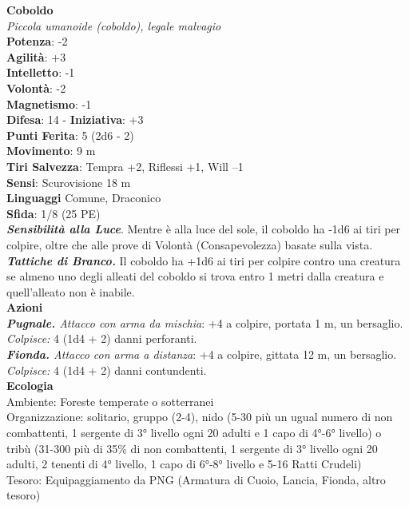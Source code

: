 \begin{multicols}{2}
\medskip\textbf{Coboldo}\\
\emph{Piccola umanoide (coboldo), legale malvagio}\\
\textbf{Potenza}: -2\\
\textbf{Agilità}: +3\\
\textbf{Intelletto}: -1\\
\textbf{Volontà}: -2\\
\textbf{Magnetismo}: -1\\
\textbf{Difesa}: 14 - \textbf{Iniziativa}: +3\\
\textbf{Punti Ferita}: 5 (2d6 - 2)\\
\textbf{Movimento}: 9 m\\
\textbf{Tiri Salvezza}: Tempra +2, Riflessi +1, Will –1\\
\textbf{Sensi}: Scurovisione 18 m\\
\textbf{Linguaggi} Comune, Draconico\\
\textbf{Sfida}: 1/8 (25 PE)\smallskip\\
\emph{\textbf{Sensibilità alla Luce}}. Mentre è alla luce del sole, il coboldo ha -1d6 ai tiri per colpire, oltre che alle prove di Volontà (Consapevolezza) basate sulla vista.\\
\emph{\textbf{Tattiche di Branco.}} Il coboldo ha +1d6 ai tiri per colpire contro una creatura se almeno uno degli alleati del coboldo si trova entro 1 metri dalla creatura e quell'alleato non è inabile. \\
\smallskip\textbf{Azioni}\\
\emph{\textbf{Pugnale.} Attacco con arma da mischia}: +4 a colpire, portata 1 m, un bersaglio.\\
\emph{Colpisce:} 4 (1d4 + 2) danni perforanti.\\
\emph{\textbf{Fionda.} Attacco con arma a distanza}: +4 a colpire, gittata 12 m, un bersaglio.\\
\emph{Colpisce:} 4 (1d4 + 2) danni contundenti.\\
\textbf{Ecologia}\\
Ambiente: Foreste temperate o sotterranei\\
Organizzazione: solitario, gruppo (2-4), nido (5-30 più un ugual numero di non combattenti, 1 sergente di 3° livello ogni 20 adulti e 1 capo di 4°-6° livello) o tribù (31-300 più di 35\% di non combattenti, 1 sergente di 3° livello ogni 20 adulti, 2 tenenti di 4° livello, 1 capo di 6°-8° livello e 5-16 Ratti Crudeli)\\
Tesoro: Equipaggiamento da PNG (Armatura di Cuoio, Lancia, Fionda, altro tesoro)\\

\end{multicols}
